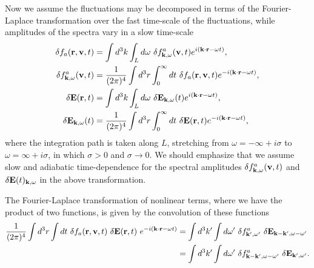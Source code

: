 \documentclass[12pt,a4paper,ruledheader]{report}
\begin{document}
Now we assume the fluctuations may be decomposed in terms of the
Fourier-Laplace transformation over the fast time-scale of the
fluctuations, while amplitudes of the spectra vary in a slow
time-scale
\begin{equation}
\begin{split}
  \delta f_a({\bf r}, {\bf v},t)
  &=\int d^3k \int_L d \omega\
  \delta f^a_{{\bf k}, \omega}({\bf v}, t)e^{i({\bf k \cdot r}-\omega t)},\\
  \delta f^a_{{\bf k}, \omega}({\bf v}, t)
  &=\frac{1}{(2 \pi)^4} \int d^3 r \int_0^{\infty} dt\
  \delta f_a({\bf r}, {\bf v},t) e^{-i({\bf k \cdot r} - \omega t)},\\
  \delta {\bf E}({\bf r},t)
  &=\int d^3 k \int_L d \omega\ \delta {\bf E}_{{\bf k},\omega}(t)
  e^{i({\bf k \cdot r}-\omega t)},\\
  \delta {\bf E}_{{\bf k},\omega}(t)
  &=\frac{1}{(2 \pi)^4}\int d^3 r \int_0^{\infty} dt\
  \delta {\bf E}({\bf r},t) e^{-i({\bf k \cdot r} - \omega t)},
\end{split}
\end{equation}
where the integration path is taken along $L$, stretching from
$\omega = -\infty +i\sigma$ to $\omega=\infty+i\sigma$, in which
$\sigma >0$ and $\sigma \rightarrow 0$. We should emphasize that
we assume slow and adiabatic time-dependence for the spectral
amplitudes $\delta f^a_{{\bf k},\omega}({\bf v},t)$ and
$\delta {\bf E}(t)_{{\bf k}, \omega}$ in the above transformation.

The Fourier-Laplace transformation of nonlinear terms, where we
have the product of two functions, is given by the convolution
of these functions
\begin{equation}
\begin{split}
\frac{1}{(2\pi)^4}\int d^3r \int dt\ \delta f_a({\bf r}, {\bf v},t)\
\delta {\bf E}({\bf r},t)\ e^{-i({\bf k \cdot r}-\omega t)}
&=\int d^3 k' \int d \omega '\ \delta f^a_{{\bf k'}, \omega '}\
\delta {\bf E}_{{\bf k-k'},\omega-\omega '}\\
&=\int d^3 k' \int d \omega '\ \delta f^a_{{\bf k-k'}, \omega-\omega '}\
\delta {\bf E}_{{\bf k'},\omega '}.
\end{split}
\label{conv}
\end{equation}
\end{document}
